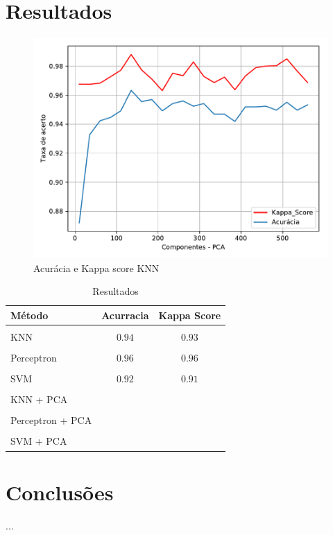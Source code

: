 \documentclass[12pt]{article}
\begin{document}
\section{Resultados}

	\begin{figure}[!htb]
	\centering
	\includegraphics[width=.5\textwidth]{knn_pca_quadratic.pdf}
	\caption{Acurácia e Kappa score KNN}
	\label{fig:knnpcaquadratic}
	\end{figure}

\begin{table}[ht]
	\centering
	\caption{Resultados}
	\label{table:resultados}
	\smallskip
	\begin{tabular}{|l|c|c|}
		\hline
		Método& Acurracia & Kappa Score\\[0.5ex]
		\hline
		&&\\[-2ex]
		KNN & $0.94$ & $0.93$\\[0.5ex]
		\hline
		&&\\[-2ex]
		Perceptron & $0.96$ & $0.96$\\[0.5ex]
		\hline
		&&\\[-2ex]
		SVM & $0.92$ & $0.91$\\[0.5ex]
		\hline
		&&\\[-2ex]
		KNN + PCA & & \\[0.5ex]
		\hline
		&&\\[-2ex]
		Perceptron + PCA & & \\[0.5ex]
		\hline
		&&\\[-2ex]
		SVM + PCA & & \\[0.5ex]
		\hline
	\end{tabular}
\end{table}

\section{Conclusões}
	...



\end{document}
